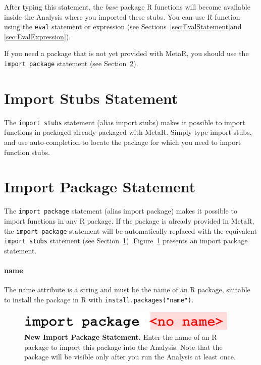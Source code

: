 \noindent{}After typing this statement, the \textit{base} package R functions will become available inside the Analysis where you imported these stubs. You can use R function using the \texttt{eval} statement or expression (see Sections~\ref{sec:EvalStatement}and \ref{sec:EvalExpression}).

If you need a package that is not yet provided with MetaR, you should use the \texttt{import package} statement (see Section~\ref{sec:ImportPackageStatement}). 

\section{Import Stubs Statement}\label{sec:ImportStubsStatement}
The \texttt{import stubs} statement (alias import stubs) makes it possible to import functions in packaged already packaged with MetaR. Simply type import stubs, and use auto-completion to locate the package for which you need to import function stubs.


\section{Import Package Statement}\label{sec:ImportPackageStatement}

The \texttt{import package} statement (alias import package) makes it possible to import functions in any R package. If the package is already provided in MetaR, the \texttt{import package} statement  will be automatically replaced with the equivalent \texttt{import stubs} statement (see Section~\ref{sec:ImportStubsStatement}). Figure~\ref{fig:NewImportPackage} presents an import package statement. 
\paragraph{name} The name attribute is a string and must be the name of an R package, suitable to install the package in R with  \texttt{install.packages("name")}.

\begin{figure}[h!tbp]
  \centering
  \includegraphics[width=\figWidthSmall]{figures/NewImportPackage.pdf}
\caption[New Import Package Statement.]{\textbf{New Import Package Statement.}  Enter the name of an R package to import this package into the Analysis. Note that the package will be visible only after you run the Analysis at least once.}
\label{fig:NewImportPackage}
\end{figure}

